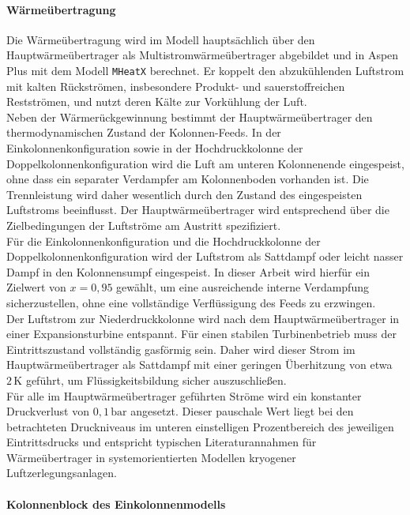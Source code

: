 \paragraph{Wärmeübertragung}\label{sec:modell_Wärmeübertragung}
Die Wärmeübertragung wird im Modell hauptsächlich über den
Hauptwärmeübertrager als Multistromwärmeübertrager abgebildet und in Aspen
Plus mit dem Modell \texttt{MHeatX} berechnet. Er koppelt den abzukühlenden
Luftstrom mit kalten Rückströmen, insbesondere Produkt- und sauerstoffreichen
Restströmen, und nutzt deren Kälte zur Vorkühlung der Luft.\\
Neben der Wärmerückgewinnung bestimmt der Hauptwärmeübertrager den
thermodynamischen Zustand der Kolonnen-Feeds. In der Einkolonnenkonfiguration
sowie in der Hochdruckkolonne der Doppelkolonnenkonfiguration wird die Luft am
unteren Kolonnenende eingespeist, ohne dass ein separater Verdampfer am
Kolonnenboden vorhanden ist. Die Trennleistung wird daher wesentlich durch den
Zustand des eingespeisten Luftstroms beeinflusst. Der Hauptwärmeübertrager wird
entsprechend über die Zielbedingungen der
Luftströme am Austritt spezifiziert.\\
Für die Einkolonnenkonfiguration und die Hochdruckkolonne der
Doppelkolonnenkonfiguration wird der Luftstrom als Sattdampf oder leicht nasser Dampf in den Kolonnensumpf eingespeist. In dieser Arbeit wird hierfür ein Zielwert von $x = 0{,}95$ gewählt, um eine ausreichende interne Verdampfung sicherzustellen, ohne eine vollständige Verflüssigung des Feeds zu erzwingen.\\
Der Luftstrom zur Niederdruckkolonne wird nach dem Hauptwärmeübertrager in
einer Expansionsturbine entspannt. Für einen stabilen Turbinenbetrieb muss der Eintrittszustand vollständig gasförmig sein. Daher wird dieser Strom im Hauptwärmeübertrager als Sattdampf mit einer geringen Überhitzung von etwa $2\,\mathrm{K}$ geführt, um Flüssigkeitsbildung sicher auszuschließen.\\
Für alle im Hauptwärmeübertrager geführten Ströme wird ein konstanter
Druckverlust von $0{,}1\,\mathrm{bar}$ angesetzt. Dieser pauschale Wert liegt bei den betrachteten Druckniveaus im unteren einstelligen Prozentbereich des jeweiligen Eintrittsdrucks und entspricht typischen Literaturannahmen für Wärmeübertrager in systemorientierten Modellen kryogener Luftzerlegungsanlagen.

\paragraph{Kolonnenblock des Einkolonnenmodells}
\label{sec:modell_kolonne_one}

